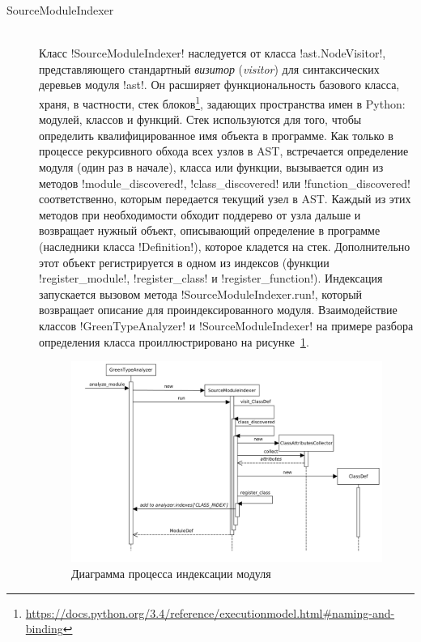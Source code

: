 \begin{description}
  \item[SourceModuleIndexer] \hfill \\ 
    Класс !SourceModuleIndexer! наследуется от
    класса !ast.NodeVisitor!, представляющего стандартный
    \emph{визитор} (\emph{visitor}) для синтаксических деревьев модуля !ast!. Он
    расширяет функциональность базового класса, храня, в частности, стек
    блоков\footnote{\url{https://docs.python.org/3.4/reference/executionmodel.html\#naming-and-binding}},
    задающих пространства имен в Python: модулей, классов и функций. Стек
    используются для того, чтобы определить квалифицированное имя
    объекта в программе.  Как только в процессе
    рекурсивного обхода всех узлов в AST, встречается определение модуля (один
    раз в начале), класса или функции, вызывается один из методов
    !module_discovered!, !class_discovered! или !function_discovered!
    соответственно, которым передается текущий узел в AST. Каждый из этих
    методов при необходимости обходит поддерево от узла дальше и возвращает
    нужный объект, описывающий определение в программе (наследники класса
    !Definition!), которое кладется на стек. Дополнительно этот объект
    регистрируется в одном из индексов
    (функции !register_module!, !register_class! и !register_function!).
    Индексация запускается вызовом метода !SourceModuleIndexer.run!, который
    возвращает описание для проиндексированного модуля. Взаимодействие классов
    !GreenTypeAnalyzer! и !SourceModuleIndexer! на примере разбора определения
    класса проиллюстрировано на рисунке~\ref{fig:indexing-diag}.

  \begin{figure}
  \begin{center}
      \includegraphics[width=\textwidth]{fig/indexing-diag.png}
  \end{center}
  \caption{Диаграмма процесса индексации модуля}
  \label{fig:indexing-diag}
  \end{figure}


\end{description}
